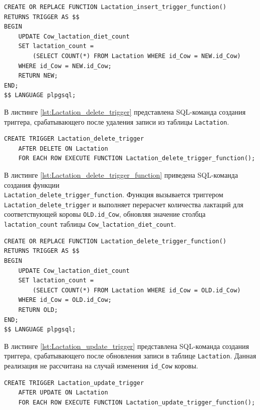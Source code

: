 \begin{lstlisting}[caption={Создание функции Lactation\_insert\_trigger\_function}, label={lst:Lactation_insert_trigger_function}]
CREATE OR REPLACE FUNCTION Lactation_insert_trigger_function()
RETURNS TRIGGER AS $$
BEGIN
    UPDATE Cow_lactation_diet_count 
    SET lactation_count = 
        (SELECT COUNT(*) FROM Lactation WHERE id_Cow = NEW.id_Cow)
    WHERE id_Cow = NEW.id_Cow;
    RETURN NEW;
END;
$$ LANGUAGE plpgsql;
\end{lstlisting}


В листинге \ref{lst:Lactation_delete_trigger} представлена SQL-команда создания триггера,
срабатывающего после удаления записи из таблицы \texttt{Lactation}.

\begin{lstlisting}[caption={Создание триггера Lactation\_delete\_trigger}, label={lst:Lactation_delete_trigger}]
CREATE TRIGGER Lactation_delete_trigger
    AFTER DELETE ON Lactation
    FOR EACH ROW EXECUTE FUNCTION Lactation_delete_trigger_function();
\end{lstlisting}

В листинге \ref{lst:Lactation_delete_trigger_function} приведена SQL-команда создания функции
\\\texttt{Lactation\_delete\_trigger\_function}.
Функция вызывается триггером \texttt{Lactation\_delete\_trigger} и выполняет
перерасчет количества лактаций для соответствующей коровы \texttt{OLD.id\_Cow},
обновляя значение столбца \texttt{lactation\_count} таблицы \texttt{Cow\_lactation\_diet\_count}.

\begin{lstlisting}[caption={Создание функции Lactation\_delete\_trigger\_function}, label={lst:Lactation_delete_trigger_function}]
CREATE OR REPLACE FUNCTION Lactation_delete_trigger_function()
RETURNS TRIGGER AS $$
BEGIN
    UPDATE Cow_lactation_diet_count 
    SET lactation_count = 
        (SELECT COUNT(*) FROM Lactation WHERE id_Cow = OLD.id_Cow)
    WHERE id_Cow = OLD.id_Cow;  
    RETURN OLD;
END;
$$ LANGUAGE plpgsql;
\end{lstlisting}

В листинге \ref{lst:Lactation_update_trigger} представлена SQL-команда создания триггера,
срабатывающего после обновления записи в таблице \texttt{Lactation}.
Данная реализация не рассчитана на случай изменения \texttt{id\_Cow} коровы.

\begin{lstlisting}[caption={Создание триггера Lactation\_update\_trigger}, label={lst:Lactation_update_trigger}]
CREATE TRIGGER Lactation_update_trigger
    AFTER UPDATE ON Lactation 
    FOR EACH ROW EXECUTE FUNCTION Lactation_update_trigger_function();
\end{lstlisting}

